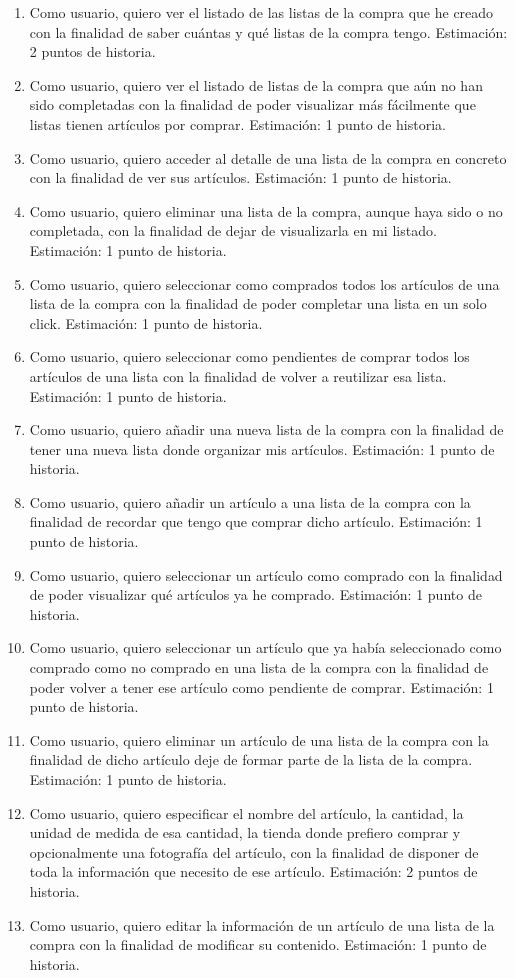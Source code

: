 \begin{enumerate}
  \item Como usuario, quiero ver el listado de las listas de la compra que he creado con la finalidad de saber cuántas y qué listas de la compra tengo. Estimación: 2 puntos de historia.
  \item Como usuario, quiero ver el listado de listas de la compra que aún no han sido completadas con la finalidad de poder visualizar más fácilmente que listas tienen artículos por comprar. Estimación: 1 punto de historia.
  \item Como usuario, quiero acceder al detalle de una lista de la compra en concreto con la finalidad de ver sus artículos. Estimación: 1 punto de historia.
  \item Como usuario, quiero eliminar una lista de la compra, aunque haya sido o no completada, con la finalidad de dejar de visualizarla en mi listado. Estimación: 1 punto de historia.
  \item Como usuario, quiero seleccionar como comprados todos los artículos de una lista de la compra con la finalidad de poder completar una lista en un solo click. Estimación: 1 punto de historia.
  \item Como usuario, quiero seleccionar como pendientes de comprar todos los artículos de una lista con la finalidad de volver a reutilizar esa lista. Estimación: 1 punto de historia.
  \item Como usuario, quiero añadir una nueva lista de la compra con la finalidad de tener una nueva lista donde organizar mis artículos. Estimación: 1 punto de historia.
  \item Como usuario, quiero añadir un artículo a una lista de la compra con la finalidad de recordar que tengo que comprar dicho artículo. Estimación: 1 punto de historia.
  \item Como usuario, quiero seleccionar un artículo como comprado con la finalidad de poder visualizar qué artículos ya he comprado. Estimación: 1 punto de historia.
  \item 	Como usuario, quiero seleccionar un artículo que ya había seleccionado como comprado como no comprado en una lista de la compra con la finalidad de poder volver a tener ese artículo como pendiente de comprar. Estimación: 1 punto de historia.
  \item Como usuario, quiero eliminar un artículo de una lista de la compra con la finalidad de dicho artículo deje de formar parte de la lista de la compra. Estimación: 1 punto de historia.
  \item Como usuario, quiero especificar el nombre del artículo, la cantidad, la unidad de medida de esa cantidad, la tienda donde prefiero comprar y opcionalmente una fotografía del artículo, con la finalidad de disponer de toda la información que necesito de ese artículo. Estimación: 2 puntos de historia.
  \item Como usuario, quiero editar la información de un artículo de una lista de la compra con la finalidad de modificar su contenido. Estimación: 1 punto de historia.
\end{enumerate}

